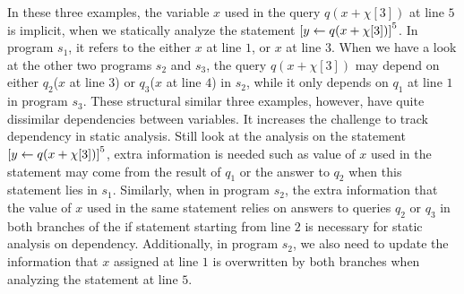 In these three examples, the variable $x$ used in the query $q(x+\chi[3])$ at line $5$ is implicit, when we statically analyze the statement $\left[ \mathrel{ y \leftarrow q(x+\chi[3]) } \right]^{5}$. In program $s_1$, it refers to the either $x$ at line $1$, or $x$ at line $3$.  When we have a look at the other two programs $s_2$ and $s_3$, the query $q(x+\chi[3])$ may depend on either $q_2$($x$ at line $3$) or $q_3$($x$ at line $4$) in $s_2$, while it only depends on $q_1$ at line $1$ in program $s_3$. These structural similar three examples, however, have quite dissimilar dependencies between variables. It increases the challenge to track dependency in static analysis. Still look at the analysis on the statement $\left[ \mathrel{ y \leftarrow q(x+\chi[3]) } \right]^{5}$, extra information is needed such as value of $x$ used in the statement may come from the result of $q_1$ or the answer to $q_2$ when this statement lies in $s_1$. Similarly, when in program $s_2$, the extra information that the value of $x$ used in the same statement relies on answers to queries $q_2$ or $q_3$ in both branches of the if statement starting from line $2$ is necessary for static analysis on dependency. Additionally, in program $s_2$, we also need to update the information that $x$ assigned at line $1$ is overwritten by both branches when analyzing the statement at line $5$.   


